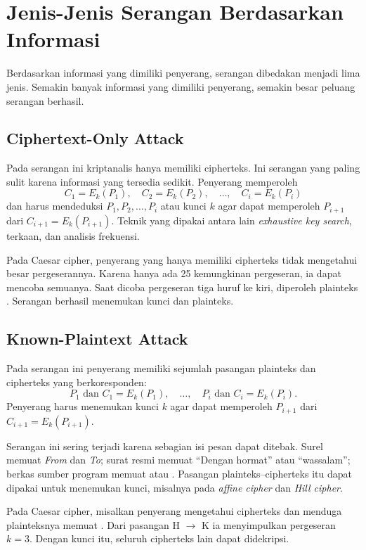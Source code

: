 \section{Jenis-Jenis Serangan Berdasarkan Informasi}
\label{sec:jenis-serangan-informasi}

Berdasarkan informasi yang dimiliki penyerang, serangan dibedakan menjadi lima
jenis. Semakin banyak informasi yang dimiliki penyerang, semakin besar peluang
serangan berhasil.

\subsection{Ciphertext-Only Attack}

Pada serangan ini kriptanalis hanya memiliki cipherteks. Ini serangan yang paling
sulit karena informasi yang tersedia sedikit. Penyerang memperoleh
\[
    C_1 = E_k(P_1),\quad C_2 = E_k(P_2),\quad \dots,\quad C_i = E_k(P_i)
\]
dan harus mendeduksi $P_1, P_2, \dots, P_i$ atau kunci $k$ agar dapat memperoleh
$P_{i+1}$ dari $C_{i+1} = E_k(P_{i+1})$. Teknik yang dipakai antara lain
\textit{exhaustive key search}, terkaan, dan analisis frekuensi.

Pada Caesar cipher, penyerang yang hanya memiliki cipherteks 
tidak mengetahui besar pergeserannya. Karena hanya ada 25 kemungkinan pergeseran,
ia dapat mencoba semuanya. Saat dicoba pergeseran tiga huruf ke kiri, diperoleh
plainteks . Serangan berhasil menemukan kunci dan plainteks.

\subsection{Known-Plaintext Attack}

Pada serangan ini penyerang memiliki sejumlah pasangan plainteks dan cipherteks
yang berkoresponden:
\[
    P_1 \text{ dan } C_1 = E_k(P_1),\quad \dots,\quad P_i \text{ dan } C_i = E_k(P_i).
\]
Penyerang harus menemukan kunci $k$ agar dapat memperoleh $P_{i+1}$ dari
$C_{i+1} = E_k(P_{i+1})$.

Serangan ini sering terjadi karena sebagian isi pesan dapat ditebak. Surel
memuat \textit{From} dan \textit{To}; surat resmi memuat ``Dengan hormat'' atau
``wassalam''; berkas sumber program memuat  atau .
Pasangan plainteks--cipherteks itu dapat dipakai untuk menemukan kunci, misalnya
pada \textit{affine cipher} dan \textit{Hill cipher}.

Pada Caesar cipher, misalkan penyerang mengetahui cipherteks 
dan menduga plainteksnya memuat . Dari pasangan H $\rightarrow$ K ia
menyimpulkan pergeseran $k = 3$. Dengan kunci itu, seluruh cipherteks lain dapat
didekripsi.

